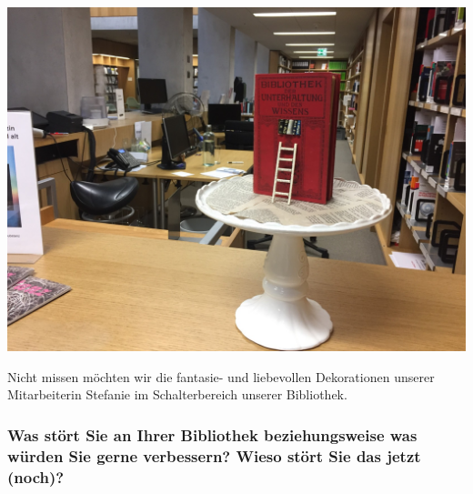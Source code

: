 \begin{center}
\includegraphics{fhs-st-gallen/img/deko.jpg}
\end{center}

Nicht missen möchten wir die fantasie- und liebevollen Dekorationen
unserer Mitarbeiterin Stefanie im Schalterbereich unserer Bibliothek.

\hypertarget{was-stuxf6rt-sie-an-ihrer-bibliothek-beziehungsweise-was-wuxfcrden-sie-gerne-verbessern-wieso-stuxf6rt-sie-das-jetzt-noch}{%
\subsubsection*{Was stört Sie an Ihrer Bibliothek beziehungsweise was würden
Sie gerne verbessern? Wieso stört Sie das jetzt
(noch)?}\label{was-stuxf6rt-sie-an-ihrer-bibliothek-beziehungsweise-was-wuxfcrden-sie-gerne-verbessern-wieso-stuxf6rt-sie-das-jetzt-noch}}

